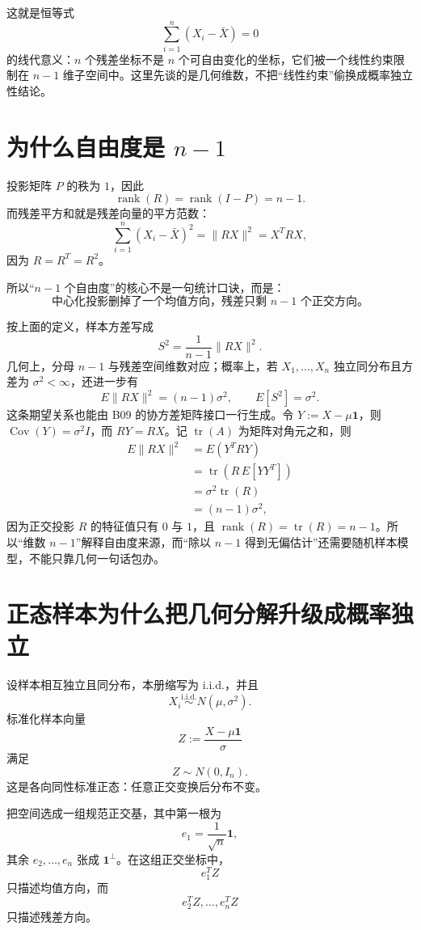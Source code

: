 \documentclass[profile=standard]{ipara-handbook}
\begin{document}
这就是恒等式
\[
\sum_{i=1}^n(X_i-\bar X)=0
\]
的线代意义：$n$ 个残差坐标不是 $n$ 个可自由变化的坐标，它们被一个线性约束限制在 $n-1$ 维子空间中。这里先谈的是几何维数，不把“线性约束”偷换成概率独立性结论。

\section{为什么自由度是 $n-1$}
投影矩阵 $P$ 的秩为 $1$，因此
\[
\operatorname{rank}(R)
=\operatorname{rank}(I-P)
=n-1.
\]
而残差平方和就是残差向量的平方范数：
\[
\sum_{i=1}^n(X_i-\bar X)^2
=\lVert RX\rVert^2
=X^TRX,
\]
因为 $R=R^T=R^2$。

所以“$n-1$ 个自由度”的核心不是一句统计口诀，而是：
\[
\boxed{\text{中心化投影删掉了一个均值方向，残差只剩 }n-1\text{ 个正交方向。}}
\]

按上面的定义，样本方差写成
\[
S^2=\frac{1}{n-1}\lVert RX\rVert^2.
\]
几何上，分母 $n-1$ 与残差空间维数对应；概率上，若 $X_1,\dots,X_n$ 独立同分布且方差为 $\sigma^2<\infty$，还进一步有
\[
E\lVert RX\rVert^2=(n-1)\sigma^2,
\qquad
E[S^2]=\sigma^2.
\]
这条期望关系也能由 B09 的协方差矩阵接口一行生成。令 $Y:=X-\mu\mathbf1$，则 $\operatorname{Cov}(Y)=\sigma^2I$，而 $RY=RX$。记 $\operatorname{tr}(A)$ 为矩阵对角元之和，则
\[
\begin{aligned}
E\lVert RX\rVert^2
&=E(Y^TRY)\\
&=\operatorname{tr}\!\left(R\,E[YY^T]\right)\\
&=\sigma^2\operatorname{tr}(R)\\
&=(n-1)\sigma^2,
\end{aligned}
\]
因为正交投影 $R$ 的特征值只有 $0$ 与 $1$，且 $\operatorname{rank}(R)=\operatorname{tr}(R)=n-1$。所以“维数 $n-1$”解释自由度来源，而“除以 $n-1$ 得到无偏估计”还需要随机样本模型，不能只靠几何一句话包办。

\section{正态样本为什么把几何分解升级成概率独立}
设样本相互独立且同分布，本册缩写为 i.i.d.，并且
\[
X_i\overset{\mathrm{i.i.d.}}\sim N(\mu,\sigma^2).
\]
标准化样本向量
\[
Z:=\frac{X-\mu\mathbf1}{\sigma}
\]
满足
\[
Z\sim N(0,I_n).
\]
这是各向同性标准正态：任意正交变换后分布不变。

把空间选成一组规范正交基，其中第一根为
\[
e_1=\frac1{\sqrt n}\mathbf1,
\]
其余 $e_2,\dots,e_n$ 张成 $\mathbf1^\perp$。在这组正交坐标中，
\[
e_1^TZ
\]
只描述均值方向，而
\[
e_2^TZ,\dots,e_n^TZ
\]
只描述残差方向。
\end{document}
